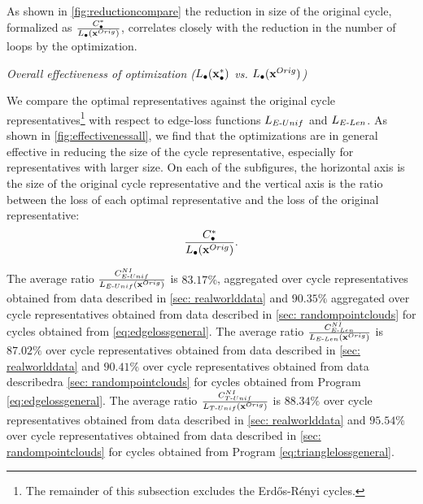As shown in \fig \ref{fig:reductioncompare} the reduction in size of the original cycle, formalized as $\frac{C^*_\bullet}{L_\bullet(\mathbf{x}^{Orig})}$,  correlates closely with the reduction in the number of loops by the optimization.


\noindent \emph{Overall effectiveness of optimization ($L_\bullet(\mathbf{x}_\bullet^*)$ vs. $L_\bullet(\mathbf{x}^{Orig})$)} 

We compare the optimal representatives against the original cycle representatives\footnote{The remainder of this subsection excludes the Erd\H{o}s-R\'enyi cycles.} with respect to edge-loss functions $L_{E\text{-}Unif}$ and $L_{E\text{-}Len}$. As shown in \fig \ref{fig:effectivenessall}, we find that the optimizations are in general effective in reducing the size of the cycle representative, especially for representatives with larger size. On each of the subfigures, the horizontal axis is the size of the original cycle representative and the vertical axis is the ratio between the loss of each optimal representative and the loss of the original representative:
$$\frac{C^*_\bullet}{L_\bullet(\mathbf{x}^{Orig})}.$$ 

The average ratio $\frac{C^{NI}_{E\text{-}Unif}}{L_{E\text{-}Unif}(\mathbf{x}^{Orig})}$ is $83.17\%$, aggregated over cycle representatives obtained from data described in \se \ref{sec: realworlddata} and $90.35\%$  aggregated over cycle representatives obtained from data described in \se \ref{sec: randompointclouds} for cycles obtained from \pr \eqref{eq:edgelossgeneral}. The average ratio $\frac{C^{NI}_{E\text{-}Len}}{L_{E\text{-}Len}(\mathbf{x}^{Orig})}$ is $87.02\%$ over cycle representatives obtained from data described in \se \ref{sec: realworlddata} and $90.41\%$ over cycle representatives obtained from data describedra \se \ref{sec: randompointclouds} for cycles obtained from Program \eqref{eq:edgelossgeneral}. The average ratio $\frac{C^{NI}_{T\text{-}Unif}}{L_{T\text{-}Unif}(\mathbf{x}^{Orig})}$ is $88.34\%$ over cycle representatives obtained from data described in \se \ref{sec: realworlddata} and $95.54\%$ over cycle representatives obtained from data described in \se \ref{sec: randompointclouds} for cycles obtained from Program \eqref{eq:trianglelossgeneral}.

